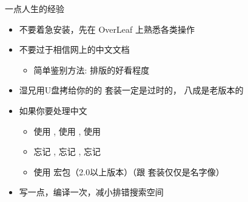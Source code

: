 \begin{frame}{一点人生的经验}
  \begin{itemize}
    \item 不要着急安装，先在 OverLeaf 上熟悉各类操作
    \item 不要过于相信网上的中文文档
          \begin{itemize}
            \item 简单鉴别方法: 排版的好看程度
          \end{itemize}
    \item 湿兄用U盘拷给你的的 \CTeX{} 套装一定是过时的，\SJTUThesis{} 八成是老版本的
    \item 如果你要处理中文
          \begin{itemize}
            \item 使用 \XeLaTeX{}, 使用 \XeLaTeX{}, 使用 \XeLaTeX{}
            \item 忘记 , 忘记 , 忘记 
            \item 使用  宏包（2.0以上版本）（跟 \CTeX{} 套装仅仅是名字像）
          \end{itemize}
    \item 写一点，编译一次，减小排错搜索空间
  \end{itemize}
\end{frame}

